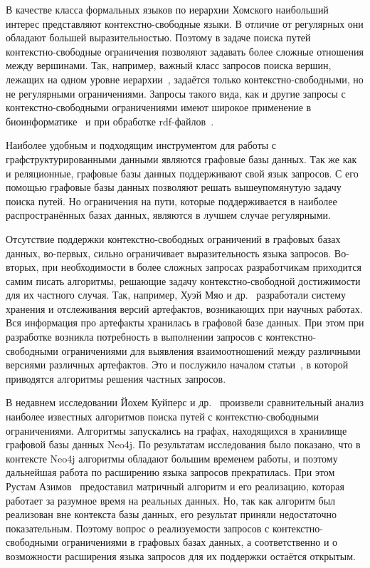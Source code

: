 \documentclass[14pt]{matmex-diploma-custom}
\begin{document}
В качестве класса формальных языков по иерархии Хомского наибольший интерес представляют контекстно-свободные языки. В отличие от регулярных они обладают большей выразительностью. Поэтому в задаче поиска путей контекстно-свободные ограничения позволяют задавать более сложные отношения между вершинами. Так, например, важный класс запросов поиска вершин, лежащих на одном уровне иерархии~\cite{zhlang-2016}, задаётся только контекстно-свободными, но не регулярными ограничениями. Запросы такого вида, как и другие запросы с контекстно-свободными ограничениями имеют широкое применение в биоинформатике~\cite{bio-application} и при обработке rdf-файлов~\cite{zhlang-2016}.

Наиболее удобным и подходящим инструментом для работы с граф\-структурированными данными являются графовые базы данных. Так же как и реляционные, графовые базы данных поддерживают свой язык запросов. С его помощью графовые базы данных позволяют решать вышеупомянутую задачу поиска путей. Но ограничения на пути, которые поддерживается в наиболее распространённых базах данных, являются в лучшем случае регулярными.

Отсутствие поддержки контекстно-свободных ограничений в графовых базах данных, во-первых, сильно ограничивает выразительность языка запросов. Во-вторых, при необходимости в более сложных запросах разработчикам приходится самим писать алгоритмы, решающие задачу контекстно-свободной достижимости для их частного случая. Так, например, Хуэй Мяо и др.~\cite{datascince-lifecycle} разработали систему хранения и отслеживания версий артефактов, возникающих при научных работах. Вся информация про артефакты хранилась в графовой базе данных. При этом при разработке возникла потребность в выполнении запросов с контекстно-свободными ограничениями для выявления взаимоотношений между различными версиями различных артефактов. Это и послужило началом статьи~\cite{datascince-lifecycle}, в которой приводятся алгоритмы решения частных запросов.

В недавнем исследовании Йохем Куйперс и др.~\cite{Kuijpers:2019:ESC:3335783.3335791} произвели сравнительный анализ наиболее известных алгоритмов поиска путей с конте\-кстно-свободными ограничениями. Алгоритмы запускались на графах, находящихся в хранилище графовой базы данных Neo4j. По результатам исследования было показано, что в контексте Neo4j алгоритмы обладают большим временем работы, и поэтому дальнейшая работа по расширению языка запросов прекратилась. При этом Рустам Азимов~\cite{Azimov:2018:CPQ:3210259.3210264} предоставил матричный алгоритм и его реализацию, которая работает за разумное время на реальных данных. Но, так как алгоритм был реализован вне контекста базы данных, его результат приняли недостаточно показательным. Поэтому вопрос о реализуемости запросов с контекстно-свободными ограничениями в графовых базах данных, а соответственно и о возможности расширения языка запросов для их поддержки остаётся открытым.
\end{document}
